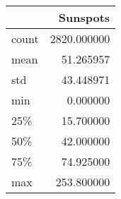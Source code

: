 \begin{tabular}{lr}
\toprule
{} &     Sunspots \\
\midrule
count &  2820.000000 \\
mean  &    51.265957 \\
std   &    43.448971 \\
min   &     0.000000 \\
25\%   &    15.700000 \\
50\%   &    42.000000 \\
75\%   &    74.925000 \\
max   &   253.800000 \\
\bottomrule
\end{tabular}
